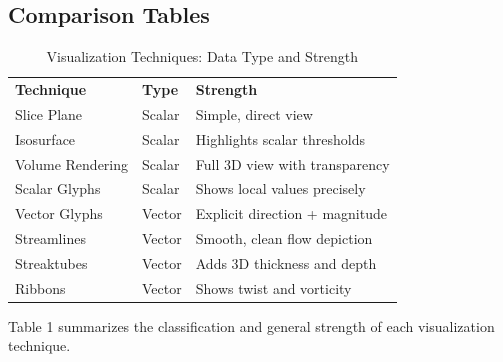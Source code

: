 \documentclass[11pt]{article}
\begin{document}
	
	\subsection{Comparison Tables}
	
		\begin{table}[H]
		\centering
		\caption{Visualization Techniques: Data Type and Strength}
		\renewcommand{\arraystretch}{1.3}
		\begin{tabular}{|l|l|l|}
			\hline
			\textbf{Technique} & \textbf{Type} & \textbf{Strength} \\

			Slice Plane        & Scalar        & Simple, direct view \\

			Isosurface         & Scalar        & Highlights scalar thresholds \\

			Volume Rendering   & Scalar        & Full 3D view with transparency \\

			Scalar Glyphs      & Scalar        & Shows local values precisely \\

			Vector Glyphs      & Vector        & Explicit direction + magnitude \\

			Streamlines        & Vector        & Smooth, clean flow depiction \\

			Streaktubes        & Vector        & Adds 3D thickness and depth \\

			Ribbons            & Vector        & Shows twist and vorticity \\
			\hline
		\end{tabular}
	\end{table}
	
	\noindent Table 1 summarizes the classification and general strength of each visualization technique.
	
	\vspace{3em}
	
\end{document}
